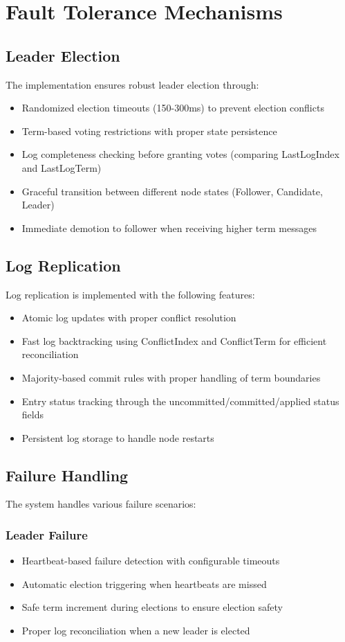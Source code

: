 \documentclass{article}
\begin{document}
\section{Fault Tolerance Mechanisms}

\subsection{Leader Election}
The implementation ensures robust leader election through:
\begin{itemize}
    \item Randomized election timeouts (150-300ms) to prevent election conflicts
    \item Term-based voting restrictions with proper state persistence
    \item Log completeness checking before granting votes (comparing LastLogIndex and LastLogTerm)
    \item Graceful transition between different node states (Follower, Candidate, Leader)
    \item Immediate demotion to follower when receiving higher term messages
\end{itemize}

\subsection{Log Replication}
Log replication is implemented with the following features:
\begin{itemize}
    \item Atomic log updates with proper conflict resolution
    \item Fast log backtracking using ConflictIndex and ConflictTerm for efficient reconciliation
    \item Majority-based commit rules with proper handling of term boundaries
    \item Entry status tracking through the uncommitted/committed/applied status fields
    \item Persistent log storage to handle node restarts
\end{itemize}

\subsection{Failure Handling}
The system handles various failure scenarios:

\subsubsection{Leader Failure}
\begin{itemize}
    \item Heartbeat-based failure detection with configurable timeouts
    \item Automatic election triggering when heartbeats are missed
    \item Safe term increment during elections to ensure election safety
    \item Proper log reconciliation when a new leader is elected
\end{itemize}
\end{document}
